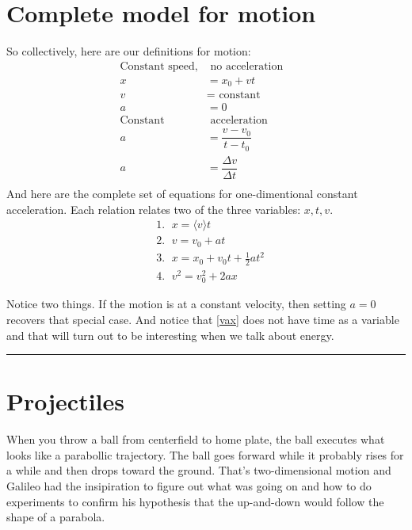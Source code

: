 \documentclass[
  letterpaper,
  DIV=11,
  numbers=noendperiod,
  oneside]{scrreprt}
\begin{document}
\section{Complete model for motion}\label{sec-equationsofmotion}

So collectively, here are our definitions for motion: \[
\begin{align}
\text{Constant speed,}&\text{ no acceleration} \nonumber \\
x &= x_0 + vt \nonumber \\
v &= \text{ constant} \nonumber \\
a &= 0 \nonumber \\
\text{Constant}&\text{ acceleration}& \nonumber \\
a &=\dfrac{v-v_0}{t-t_0} \nonumber \\
a &= \dfrac{\Delta v}{\Delta t} \nonumber \\
\end{align}
\] And here are the complete set of equations for one-dimentional
constant acceleration. Each relation relates two of the three variables:
\(x, t, v\). \[
\begin{align}
& \text{1. } \; x = \langle v \rangle t \label{avev} \\ 
& \text{2.  } \; v   = v_0 + at \label{vat} \\
& \text{3. }  \; x   = x_0+v_0 t + \frac{1}{2} at^2 \label{xat}  \\
& \text{4. }\; v^2   = v_0^2 + 2ax \label{vax} 
\end{align}
\]

Notice two things. If the motion is at a constant velocity, then setting
\(a=0\) recovers that special case. And notice that \eqref{vax} does not
have time as a variable and that will turn out to be interesting when we
talk about energy.

\begin{center}\rule{0.5\linewidth}{0.5pt}\end{center}

\section{Projectiles}\label{sec-projectiles}

When you throw a ball from centerfield to home plate, the ball executes
what looks like a parabollic trajectory. The ball goes forward while it
probably rises for a while and then drops toward the ground. That's
two-dimensional motion and Galileo had the insipiration to figure out
what was going on and how to do experiments to confirm his hypothesis
that the up-and-down would follow the shape of a parabola.
\end{document}

